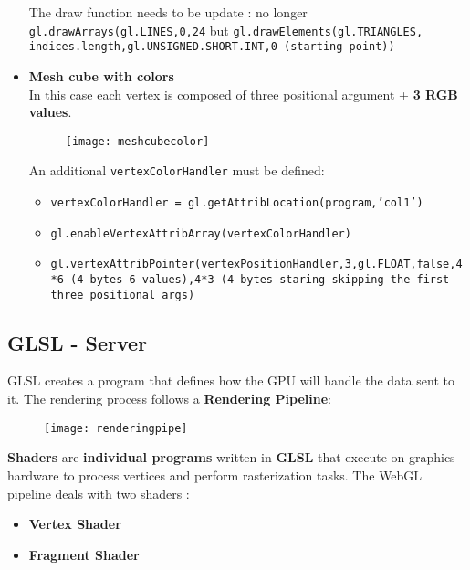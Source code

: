 \begin{itemize}
 The draw function needs to be update : no longer \texttt{gl.drawArrays(gl.LINES,0,24}  but \texttt{gl.drawElements(gl.TRIANGLES, indices.length,gl.UNSIGNED.SHORT.INT,0 (starting point))}
\item \textbf{Mesh cube with colors}\\
In this case each vertex is composed of three positional argument + \textbf{3 RGB values}.
 \begin{figure}[H]
 \centering
 \texttt{[image: meshcubecolor]} 
 \end{figure}
 An additional \texttt{vertexColorHandler} must be defined:
 \begin{itemize}
\item \texttt{vertexColorHandler = gl.getAttribLocation(program,'col1')}
\item \texttt{gl.enableVertexAttribArray(vertexColorHandler)}
\item \texttt{gl.vertexAttribPointer(vertexPositionHandler,3,gl.FLOAT,false,4*6 (4  bytes 6 values),4*3 (4 bytes staring skipping the first three positional args)}
 \end{itemize}
\end{itemize}

\subsection{GLSL - Server}
GLSL creates a program that defines how the GPU will handle the data sent to it. 
The rendering process follows a \textbf{Rendering Pipeline}:
 \begin{figure}[H]
 \centering
 \texttt{[image: renderingpipe]} 
 \end{figure}
\textbf{Shaders} are \textbf{individual programs} written in \textbf{GLSL} that execute on graphics hardware to process vertices and perform rasterization tasks.
The WebGL pipeline deals with two shaders :
\begin{itemize}
\item \textbf{Vertex Shader}
\item \textbf{Fragment Shader}
\end{itemize}

